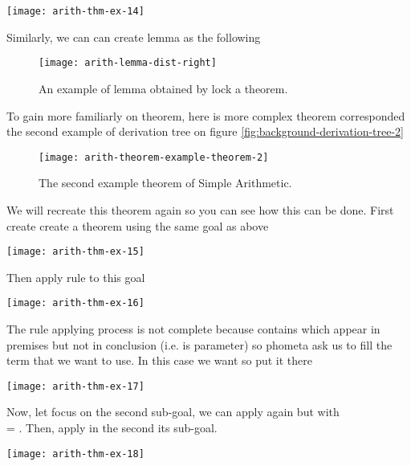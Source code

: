 \documentclass[master.tex]{subfiles}
\begin{document}
\begin{center}
\texttt{[image: arith-thm-ex-14]}
\end{center}

Similarly, we can can create lemma  as the following

\begin{figure}[H]
    \centering
\begin{minipage}{0.8\textwidth}
    \texttt{[image: arith-lemma-dist-right]}
\end{minipage}
\caption{An example of lemma obtained by lock a theorem.}
\label{fig:arith-lemma-dist-right}
\end{figure}

To gain more familiarly on theorem, here is more complex theorem corresponded
the second example of derivation tree on figure \ref{fig:background-derivation-tree-2}

\begin{figure}[H]
    \centering
\begin{minipage}{\textwidth}
    \texttt{[image: arith-theorem-example-theorem-2]}
\end{minipage}
\caption{The second example theorem of Simple Arithmetic.}
\label{fig:arith-theorem-example-theorem-2}
\end{figure}

We will recreate this theorem again so you can see how this can be done. First
create create a theorem  using the same goal as above

\texttt{[image: arith-thm-ex-15]}

Then apply rule  to this goal

\texttt{[image: arith-thm-ex-16]}

The rule applying process is not complete because  contains
 which appear in premises but not in conclusion (i.e.  is
parameter) so phometa ask us to fill the term that we want to use. In this case
we want  so put it there

\texttt{[image: arith-thm-ex-17]}

Now, let focus on the second sub-goal, we can apply  again but
with \\  = . Then, apply  in the second its sub-goal.

\texttt{[image: arith-thm-ex-18]}
\end{document}
